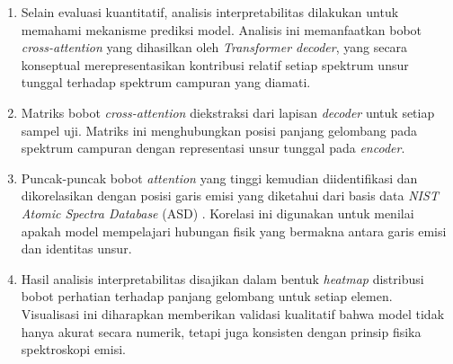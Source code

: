\begin{enumerate}
    \item Selain evaluasi kuantitatif, analisis interpretabilitas dilakukan untuk memahami mekanisme prediksi model. Analisis ini memanfaatkan bobot \textit{cross-attention} yang dihasilkan oleh \textit{Transformer decoder}, yang secara konseptual merepresentasikan kontribusi relatif setiap spektrum unsur tunggal terhadap spektrum campuran yang diamati.

    \item Matriks bobot \textit{cross-attention} diekstraksi dari lapisan \textit{decoder} untuk setiap sampel uji. Matriks ini menghubungkan posisi panjang gelombang pada spektrum campuran dengan representasi unsur tunggal pada \textit{encoder}.

    \item Puncak-puncak bobot \textit{attention} yang tinggi kemudian diidentifikasi dan dikorelasikan dengan posisi garis emisi yang diketahui dari basis data \textit{NIST Atomic Spectra Database} (ASD) \citep{kramida_nist_2024}. Korelasi ini digunakan untuk menilai apakah model mempelajari hubungan fisik yang bermakna antara garis emisi dan identitas unsur.

    \item Hasil analisis interpretabilitas disajikan dalam bentuk \textit{heatmap} distribusi bobot perhatian terhadap panjang gelombang untuk setiap elemen. Visualisasi ini diharapkan memberikan validasi kualitatif bahwa model tidak hanya akurat secara numerik, tetapi juga konsisten dengan prinsip fisika spektroskopi emisi.
\end{enumerate}

